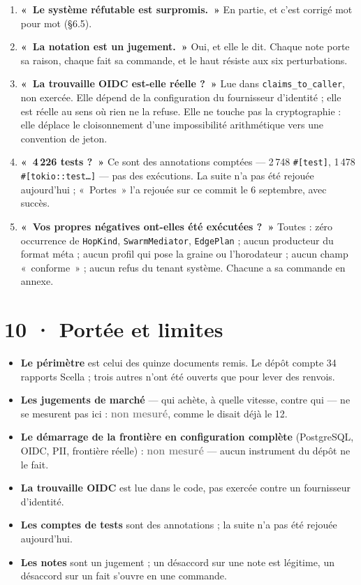 \documentclass[10pt]{article}
\newcommand{\code}[1]{\texttt{\small #1}}
\newcommand{\nm}[1]{\textcolor{grey}{\textbf{#1}}}
\begin{document}
\begin{enumerate}[leftmargin=1.5em,itemsep=2.5pt,topsep=2pt]
lui, dans des faits indépendants : zéro ligne pour le médiateur et la Colonne dès le 11 août, pureté de $\Phi$ jamais
commitée, runtime nano sans appelant, et MZ qui réfute le compresseur le 23 août. La circularité ne touche que le
critère P --- et le haut du classement survit à son retrait.
\item \textbf{«~Le système réfutable est surpromis.~»} En partie, et c'est corrigé mot pour mot (§6.5).
\item \textbf{«~La notation est un jugement.~»} Oui, et elle le dit. Chaque note porte sa raison, chaque fait sa
commande, et le haut résiste aux six perturbations.
\item \textbf{«~La trouvaille OIDC est-elle réelle ?~»} Lue dans \code{claims\_to\_caller}, non exercée. Elle dépend
de la configuration du fournisseur d'identité ; elle est réelle au sens où rien ne la refuse. Elle ne touche pas la
cryptographie : elle déplace le cloisonnement d'une impossibilité arithmétique vers une convention de jeton.
\item \textbf{«~4\,226 tests ?~»} Ce sont des annotations comptées --- 2\,748 \code{\#[test]}, 1\,478
\code{\#[tokio::test…]} --- pas des exécutions. La suite n'a pas été rejouée aujourd'hui ; «~Portes~» l'a rejouée sur
ce commit le 6 septembre, avec succès.
\item \textbf{«~Vos propres négatives ont-elles été exécutées ?~»} Toutes : zéro occurrence de \code{HopKind},
\code{SwarmMediator}, \code{EdgePlan} ; aucun producteur du format méta ; aucun profil qui pose la graine ou
l'horodateur ; aucun champ «~conforme~» ; aucun refus du tenant système. Chacune a sa commande en annexe.
\end{enumerate}

\section{10 · Portée et limites}

\begin{itemize}[leftmargin=1.3em,itemsep=1pt,topsep=2pt]
\item \textbf{Le périmètre} est celui des quinze documents remis. Le dépôt compte 34 rapports Scella ; trois autres
n'ont été ouverts que pour lever des renvois.
\item \textbf{Les jugements de marché} --- qui achète, à quelle vitesse, contre qui --- ne se mesurent pas ici :
\nm{non mesuré}, comme le disait déjà le 12.
\item \textbf{Le démarrage de la frontière en configuration complète} (PostgreSQL, OIDC, PII, frontière réelle) :
\nm{non mesuré} --- aucun instrument du dépôt ne le fait.
\item \textbf{La trouvaille OIDC} est lue dans le code, pas exercée contre un fournisseur d'identité.
\item \textbf{Les comptes de tests} sont des annotations ; la suite n'a pas été rejouée aujourd'hui.
\item \textbf{Les notes} sont un jugement ; un désaccord sur une note est légitime, un désaccord sur un fait s'ouvre
en une commande.
\end{itemize}
\end{document}
